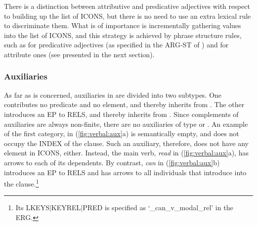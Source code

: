 There is a distinction between attributive and predicative adjectives
with respect to building up the list of ICONS, but there is no need to
use an extra lexical rule to discriminate them. What is of importance
is incrementally gathering  values into the list of
ICONS, and this strategy is achieved by phrase
structure rules, such as  for predicative
adjectives (as specified in the ARG-ST of )
and  for attribute ones (see
 presented in the next section).



\subsubsection{Auxiliaries}
\label{10:ssssec:auxiliaries}





As far as  is concerned, auxiliaries in  are divided
into two subtypes. One contributes no predicate and no
 element, and thereby inherits from
.  The other introduces an EP to RELS, and
thereby inherits from . Since complements of
auxiliaries are always non-finite, there are no auxiliaries of type
 or . An
example of the first category,  in (\ref{fig:verbal:aux}a)
is semantically empty, and does not occupy the INDEX of the
clause. Such an auxiliary, therefore, does not have any 
element in ICONS, either. Instead, the main verb, \textit{read} in
(\ref{fig:verbal:aux}a), has arrows to each of its dependents. By
contrast, \textit{can} in (\ref{fig:verbal:aux}b) introduces an EP to
RELS and has arrows to all individuals that introduce 
into the clause.\footnote{Its LKEYS{$\mid$}KEYREL{$\mid$}PRED is
  specified as `\_can\_v\_modal\_rel' in the ERG.}



